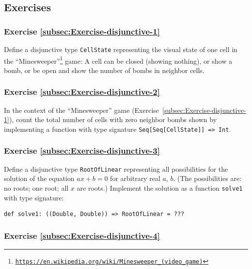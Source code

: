 \subsection{Exercises}

\subsubsection{Exercise \label{subsec:Exercise-disjunctive-1}\ref{subsec:Exercise-disjunctive-1}}

Define a disjunctive type \lstinline!CellState! representing the
visual state of one cell in the \textsf{``}Minesweeper\textsf{''}\footnote{\texttt{\href{https://en.wikipedia.org/wiki/Minesweeper_(video_game)}{https://en.wikipedia.org/wiki/Minesweeper\_(video\_game)}}}
game: A cell can be closed (showing nothing), or show a bomb, or be
open and show the number of bombs in neighbor cells.

\subsubsection{Exercise \label{subsec:Exercise-disjunctive-2}\ref{subsec:Exercise-disjunctive-2}}

In the context of the \textsf{``}Minesweeper\textsf{''} game (Exercise~\ref{subsec:Exercise-disjunctive-1}),
count the total number of cells with zero neighbor bombs shown by
implementing a function with type signature \lstinline!Seq[Seq[CellState]] => Int!.

\subsubsection{Exercise \label{subsec:Exercise-disjunctive-3}\ref{subsec:Exercise-disjunctive-3}}

Define a disjunctive type \lstinline!RootOfLinear! representing all
possibilities for the solution of the equation $ax+b=0$ for arbitrary
real $a$, $b$. (The possibilities are: no roots; one root; all $x$
are roots.) Implement the solution as a function \lstinline!solve1!
with type signature: 
\begin{lstlisting}
def solve1: ((Double, Double)) => RootOfLinear = ???
\end{lstlisting}


\subsubsection{Exercise \label{subsec:Exercise-disjunctive-4}\ref{subsec:Exercise-disjunctive-4}}

